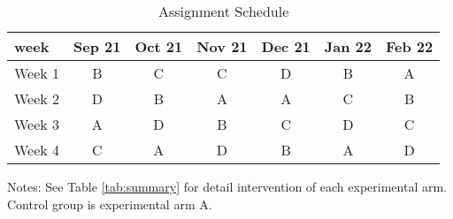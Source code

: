 \documentclass[12pt, a4paper]{article}
\begin{document}
\begin{table}[H]

\caption{\label{tab:assignment}Assignment Schedule}
\centering
\fontsize{9}{11}\selectfont
\fontsize{9}{11}\selectfont
\begin{threeparttable}
\begin{tabular}[t]{lcccccc}
\toprule
week & Sep 21 & Oct 21 & Nov 21 & Dec 21 & Jan 22 & Feb 22\\
\midrule
Week 1 & B & C & C & D & B & A\\
Week 2 & D & B & A & A & C & B\\
Week 3 & A & D & B & C & D & C\\
Week 4 & C & A & D & B & A & D\\
\bottomrule
\end{tabular}
\begin{tablenotes}
\item Notes: See Table \ref{tab:summary} for detail intervention of each experimental arm. Control group is experimental arm A.
\end{tablenotes}
\end{threeparttable}
\end{table}
\end{document}
